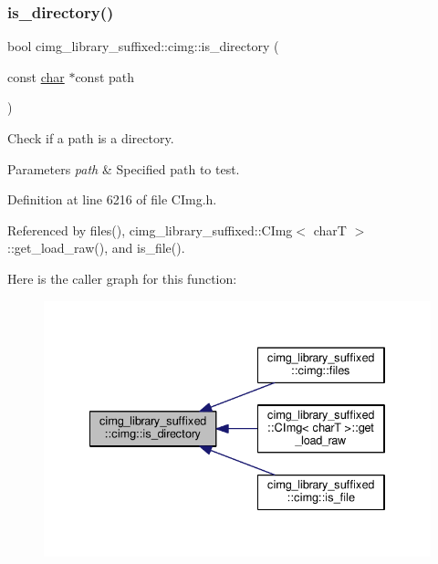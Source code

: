 \subsubsection{\texorpdfstring{is\+\_\+directory()}{is\_directory()}}
{\footnotesize\ttfamily bool cimg\+\_\+library\+\_\+suffixed\+::cimg\+::is\+\_\+directory (\begin{DoxyParamCaption}\item[{const \hyperlink{classchar}{char} $\ast$const}]{path }\end{DoxyParamCaption})\hspace{0.3cm}{\ttfamily [inline]}}



Check if a path is a directory. 


\begin{DoxyParams}{Parameters}
{\em path} & Specified path to test. \\
\hline
\end{DoxyParams}


Definition at line 6216 of file C\+Img.\+h.



Referenced by files(), cimg\+\_\+library\+\_\+suffixed\+::\+C\+Img$<$ char\+T $>$\+::get\+\_\+load\+\_\+raw(), and is\+\_\+file().

Here is the caller graph for this function\+:
\nopagebreak
\begin{figure}[H]
\begin{center}
\leavevmode
\includegraphics[width=334pt]{d4/d9b/namespacecimg__library__suffixed_1_1cimg_aca0e45a04eb1607f2e25101aae4b8572_icgraph}
\end{center}
\end{figure}
\mbox{\label{namespacecimg__library__suffixed_1_1cimg_ad6c9ae2aaaf60bdecbd5c8f57ee5617e}} 
